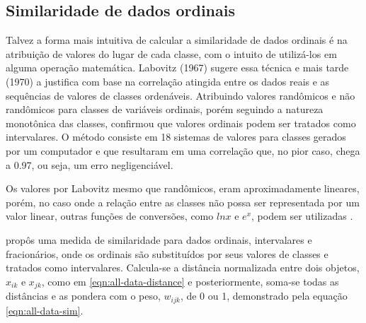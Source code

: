 \documentclass[preprint,12pt]{elsarticle}
\begin{document}




\subsection{Similaridade de dados ordinais}
\label{ssec:sim-ordinal-data}

Talvez a forma mais intuitiva de calcular a similaridade de dados ordinais é na atribuição de valores do lugar de cada classe, com o intuito de utilizá-los em alguma operação matemática. Labovitz (1967) \cite{labovitz-1967-observation-statistics} sugere essa técnica e mais tarde (1970) \cite{assignment-rank-order-1970} a justifica com base na correlação atingida entre os dados reais e as sequências de valores de classes ordenáveis. Atribuindo valores randômicos e não randômicos para classes de variáveis ordinais, porém seguindo a natureza monotônica das classes, confirmou que valores ordinais podem ser tratados como intervalares. O método consiste em 18 sistemas de valores para classes gerados por um computador e que resultaram em uma correlação que, no pior caso, chega a 0.97, ou seja, um erro negligenciável. 

Os valores por Labovitz \cite{assignment-rank-order-1970} mesmo que randômicos, eram aproximadamente lineares, porém, no caso onde a relação entre as classes não possa ser representada por um valor linear, outras funções de conversões, como $ln x$ e $e^x$, podem ser utilizadas \cite{assignment-rank-order-1970}.

\cite{analysis-cluster} propôs uma medida de similaridade para dados ordinais, intervalares e fracionários, onde os ordinais são substituídos por seus valores de classes e tratados como intervalares. Calcula-se a distância normalizada entre dois objetos, $x_{ik}$ e $x_{jk}$, como em \ref{eqn:all-data-distance} e posteriormente, soma-se todas as distâncias e as pondera com o peso, $w_{ijk}$, de 0 ou 1, demonstrado pela equação \ref{eqn:all-data-sim}.
\end{document}
